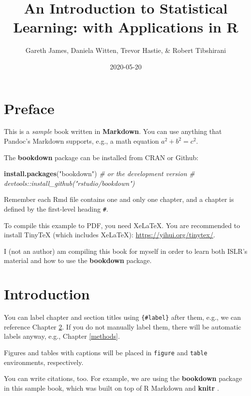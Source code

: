 \documentclass[
]{book}
\title{An Introduction to Statistical Learning: with Applications in R}
\author{Gareth James, Daniela Witten, Trevor Hastie, \& Robert Tibshirani}
\date{2020-05-20}
\newenvironment{Shaded}{\begin{snugshade}}{\end{snugshade}}
\newcommand{\CommentTok}[1]{\textcolor[rgb]{0.56,0.35,0.01}{\textit{#1}}}
\newcommand{\KeywordTok}[1]{\textcolor[rgb]{0.13,0.29,0.53}{\textbf{#1}}}
\newcommand{\NormalTok}[1]{#1}
\newcommand{\StringTok}[1]{\textcolor[rgb]{0.31,0.60,0.02}{#1}}
\begin{document}
\maketitle

{
\setcounter{tocdepth}{1}
\tableofcontents
}
\hypertarget{preface}{%
\chapter{Preface}\label{preface}}

This is a \emph{sample} book written in \textbf{Markdown}. You can use anything that Pandoc's Markdown supports, e.g., a math equation \(a^2 + b^2 = c^2\).

The \textbf{bookdown} package can be installed from CRAN or Github:

\begin{Shaded}
\begin{Highlighting}[]
\KeywordTok{install.packages}\NormalTok{(}\StringTok{"bookdown"}\NormalTok{)}
\CommentTok{# or the development version}
\CommentTok{# devtools::install_github("rstudio/bookdown")}
\end{Highlighting}
\end{Shaded}

Remember each Rmd file contains one and only one chapter, and a chapter is defined by the first-level heading \texttt{\#}.

To compile this example to PDF, you need XeLaTeX. You are recommended to install TinyTeX (which includes XeLaTeX): \url{https://yihui.org/tinytex/}.

I (not an author) am compiling this book for myself in order to learn both ISLR's material and how to use the \textbf{bookdown} package.

\hypertarget{intro}{%
\chapter{Introduction}\label{intro}}

You can label chapter and section titles using \texttt{\{\#label\}} after them, e.g., we can reference Chapter \ref{intro}. If you do not manually label them, there will be automatic labels anyway, e.g., Chapter \ref{methods}.

Figures and tables with captions will be placed in \texttt{figure} and \texttt{table} environments, respectively.

You can write citations, too. For example, we are using the \textbf{bookdown} package \citep{R-bookdown} in this sample book, which was built on top of R Markdown and \textbf{knitr} \citep{xie2015}.
\end{document}
